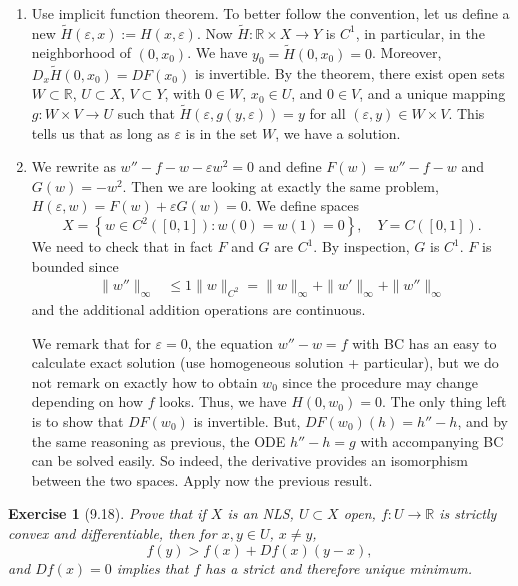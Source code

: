 \documentclass[letterpaper,twoside,11pt]{article}
\theoremstyle{mystyle}
\newtheorem*{exercise}{Exercise}
\newcommand{\R}{{\mathbb R}}
\newcommand{\cbk}{\color{black}}
\newcommand{\cblu}{\color{blue}}
\newcommand{\ve}{\varepsilon}
\begin{document}
\cblu 
  \begin{enumerate}
    \item Use implicit function theorem. To better follow the convention, let us define a new $\tilde H (\ve, x) := H(x, \ve)$. Now $\tilde H : \R \times X \to Y$ is $C^1$, in particular, in the neighborhood of $(0, x_0)$. We have $y_0 = \tilde H(0, x_0) = 0$. Moreover, $D_x\tilde H(0, x_0) = DF(x_0)$ is invertible. By the theorem, there exist open sets $W \subset \R$, $U\subset X$, $V\subset Y$, with $0 \in W$, $x_0 \in U$, and $0 \in V$, and a unique mapping $g : W \times V \to U$ such that $\tilde H(\ve, g(y, \ve)) = y$ for all $(\ve, y) \in W\times V$. This tells us that as long as $\ve$ is in the set $W$, we have a solution. 
    \item We rewrite as $w'' - f - w - \ve w^2 = 0$ and define $F(w) = w'' - f- w$ and $G(w) = -w^2$. Then we are looking at exactly the same problem, $H\left( \ve, w \right) = F(w) + \ve G(w) = 0$. We define spaces 
    \[X = \left\{ w\in C^2 ([0,1]) : w(0) = w(1) = 0 \right\}, \quad Y = C([0,1]).\]
    We need to check that in fact $F$ and $G$ are $C^1$. By inspection, $G$ is $C^1$. $F$ is bounded since 
    \begin{align*}
      \|w''\|_{\infty} &\leq 1 \|w\|_{C^2} = \|w\|_{\infty} + \|w'\|_{\infty} + \|w''\|_{\infty}
    \end{align*}
    and the additional addition operations are continuous. 

    We remark that for $\ve = 0$, the equation $w'' - w = f$ with BC has an easy to calculate exact solution (use homogeneous solution + particular), but we do not remark on exactly how to obtain $w_0$ since the procedure may change depending on how $f$ looks. Thus, we have $H(0, w_0) = 0$. The only thing left is to show that $DF(w_0)$ is invertible. But, $DF(w_0)(h) = h'' - h$, and by the same reasoning as previous, the ODE $h'' - h = g$ with accompanying BC can be solved easily. So indeed, the derivative provides an isomorphism between the two spaces. Apply now the previous result. 
  \end{enumerate}
\cbk 

\begin{exercise}[9.18]
  Prove that if $X$ is an NLS, $U\subset X$ open, $f : U\to \R$ is strictly convex and differentiable, then for $x, y \in U$, $x \neq y$, 
  \[f(y) > f(x) + Df(x)(y-x),\]
  and $Df(x) = 0$ implies that $f$ has a strict and therefore unique minimum. 
\end{exercise}
\end{document}
